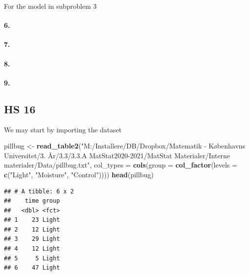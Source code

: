 \documentclass[
]{article}
\newenvironment{Shaded}{\begin{snugshade}}{\end{snugshade}}
\newcommand{\DataTypeTok}[1]{\textcolor[rgb]{0.13,0.29,0.53}{#1}}
\newcommand{\KeywordTok}[1]{\textcolor[rgb]{0.13,0.29,0.53}{\textbf{#1}}}
\newcommand{\NormalTok}[1]{#1}
\newcommand{\StringTok}[1]{\textcolor[rgb]{0.31,0.60,0.02}{#1}}
\begin{document}
For the model in subproblem 3

\hypertarget{section-77}{%
\paragraph{\texorpdfstring{\textbf{6.}}{6.}}\label{section-77}}

\hypertarget{section-78}{%
\paragraph{\texorpdfstring{\textbf{7.}}{7.}}\label{section-78}}

\hypertarget{section-79}{%
\paragraph{\texorpdfstring{\textbf{8.}}{8.}}\label{section-79}}

\hypertarget{section-80}{%
\paragraph{\texorpdfstring{\textbf{9.}}{9.}}\label{section-80}}

\hypertarget{hs-16}{%
\subsection{HS 16}\label{hs-16}}

We may start by importing the dataset

\begin{Shaded}
\begin{Highlighting}[]
\NormalTok{pillbug <-}\StringTok{ }\KeywordTok{read_table2}\NormalTok{(}\StringTok{"M:/Installere/DB/Dropbox/Matematik - Københavns Universitet/3. År/3.3/3.3.A MatStat2020-2021/MatStat Materialer/Interne materialer/Data/pillbug.txt"}\NormalTok{, }
    \DataTypeTok{col_types =} \KeywordTok{cols}\NormalTok{(}\DataTypeTok{group =} \KeywordTok{col_factor}\NormalTok{(}\DataTypeTok{levels =} \KeywordTok{c}\NormalTok{(}\StringTok{"Light"}\NormalTok{, }
        \StringTok{"Moisture"}\NormalTok{, }\StringTok{"Control"}\NormalTok{))))}
\KeywordTok{head}\NormalTok{(pillbug)}
\end{Highlighting}
\end{Shaded}

\begin{verbatim}
## # A tibble: 6 x 2
##    time group
##   <dbl> <fct>
## 1    23 Light
## 2    12 Light
## 3    29 Light
## 4    12 Light
## 5     5 Light
## 6    47 Light
\end{verbatim}
\end{document}
